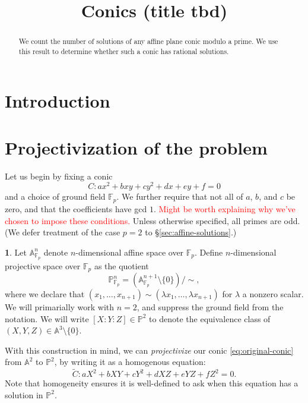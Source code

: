 \documentclass[10pt,a4paper]{amsart}
\numberwithin{equation}{section}
\numberwithin{figure}{section}
\theoremstyle{definition}
\theoremstyle{remark}
\theoremstyle{plain}
\theoremstyle{plain}
\theoremstyle{definition}
\newtheorem{defn}{\protect\definitionname}[section]
\theoremstyle{plain}
\theoremstyle{plain}
\providecommand{\definitionname}{Definition}
\newcommand{\A}{\mathbb{A}}
\renewcommand{\P}{\mathbb{P}}
\newcommand{\F}{\mathbb{F}}
\begin{document}
 

    \title{Conics (title tbd)} 

    \maketitle

    \begin{abstract} 
        We count the number of solutions of any affine plane conic modulo a prime.
        We use this result to determine whether such a conic has rational solutions. 
    \end{abstract}

    \tableofcontents

    \section{Introduction} 
    
    
    
    \section{Projectivization of the problem}

    Let us  begin by fixing a conic
    \begin{equation}\label{eq:original-conic} 
        C \colon ax^2 + bxy + cy^2 + dx + ey + f = 0 
    \end{equation} 
    and a choice of ground field $\F_p$. We further require that not all of 
    $a$, $b$, and $c$ be zero, and that the coefficients have gcd $1$.
    \textcolor{red}{Might be worth explaining why we've chosen to impose these conditions.}
    Unless otherwise specified, all primes are odd.
    (We defer treatment of the case $p = 2$ to \S\ref{sec:affine-solutions}.)
    \begin{defn}
        Let $\A^n_{\F_p}$ denote $n$-dimensional affine space over $\F_p$. Define 
        $n$-dimensional projective space over $\F_p$ as the quotient
        \[ \P^n_{\F_p} = (\A^{n+1}_{\F_p}\setminus \{0\})/{\sim}, \]
        where we declare that $(x_1,\ldots,x_{n+1}) \sim 
        (\lambda x_1,\ldots,\lambda x_{n+1})$ for $\lambda$ a nonzero scalar. We
        will primarially work with $n = 2$, and suppress the ground field from the 
        notation. We will write $[X:Y:Z]\in \P^2$ to denote the equivalence 
        class of $(X,Y,Z)\in \A^3 \setminus \{0\}$.
    \end{defn}

    With this construction in mind, we can \emph{projectivize} our conic
    \eqref{eq:original-conic} from $\A^2$ to $\P^2$, by writing it as a 
    homogenous equation: 
    \begin{equation}\label{eq:projective-conic} 
        \widetilde{C} \colon aX^2 + bXY + cY^2 + dXZ + eYZ + fZ^2 = 0. 
    \end{equation}
    Note that homogeneity ensures it is well-defined to ask when this
    equation has a solution in $\P^2$.
\end{document}
